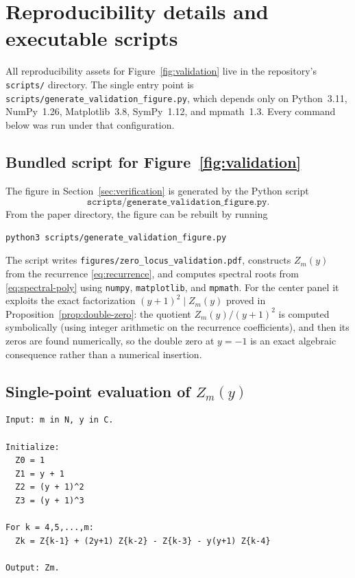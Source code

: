 \section{Reproducibility details and executable scripts}\label{app:pseudocode}

All reproducibility assets for Figure~\ref{fig:validation} live in the repository's \texttt{scripts/} directory.
The single entry point is \texttt{scripts/generate\_validation\_figure.py}, which depends only on Python~3.11, NumPy~1.26, Matplotlib~3.8, SymPy~1.12, and mpmath~1.3.
Every command below was run under that configuration.

\subsection{Bundled script for Figure~\texorpdfstring{\ref{fig:validation}}{1}}

The figure in Section~\ref{sec:verification} is generated by the Python script
\[
\texttt{scripts/generate\_validation\_figure.py}.
\]
From the paper directory, the figure can be rebuilt by running

\begin{verbatim}
python3 scripts/generate_validation_figure.py
\end{verbatim}

The script writes \texttt{figures/zero\_locus\_validation.pdf}, constructs \(Z_m(y)\) from the recurrence \eqref{eq:recurrence}, and computes spectral roots from \eqref{eq:spectral-poly} using \texttt{numpy}, \texttt{matplotlib}, and \texttt{mpmath}.
For the center panel it exploits the exact factorization $(y+1)^2\mid Z_m(y)$ proved in Proposition~\ref{prop:double-zero}: the quotient $Z_m(y)/(y+1)^2$ is computed symbolically (using integer arithmetic on the recurrence coefficients), and then its zeros are found numerically, so the double zero at $y=-1$ is an exact algebraic consequence rather than a numerical insertion.

\subsection{Single-point evaluation of \texorpdfstring{\(Z_m(y)\)}{Z\_m(y)}}

\begin{verbatim}
Input: m in N, y in C.

Initialize:
  Z0 = 1
  Z1 = y + 1
  Z2 = (y + 1)^2
  Z3 = (y + 1)^3

For k = 4,5,...,m:
  Zk = Z{k-1} + (2y+1) Z{k-2} - Z{k-3} - y(y+1) Z{k-4}

Output: Zm.
\end{verbatim}

